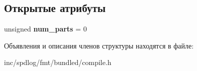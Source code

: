 \subsection*{Открытые атрибуты}
\begin{DoxyCompactItemize}
\item 
\mbox{\label{structinternal_1_1part__counter_a018e50aaafe525593f7febd5f8f89c9c}} 
unsigned {\bfseries num\+\_\+parts} = 0
\end{DoxyCompactItemize}


Объявления и описания членов структуры находятся в файле\+:\begin{DoxyCompactItemize}
\item 
inc/spdlog/fmt/bundled/compile.\+h\end{DoxyCompactItemize}
